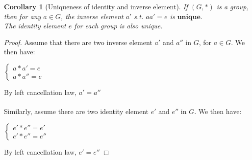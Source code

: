 \documentclass{article}
\theoremstyle{MyNonumberplain}
\theoremstyle{break}
\newtheorem*{proof}{Proof. }
\theoremstyle{break}
\newtheorem{corollary}{Corollary}[theorem]
\theoremstyle{break}
\theoremstyle{definition}
\theoremstyle{break}
\begin{document}
\begin{thmbox}
    \begin{corollary}[Uniqueness of identity and inverse element]
        If $(G,*)$ is a group, then for any $a\in G$, the inverse element $a'$ s.t. $aa'=e$ is $\mathbf{unique}$.\\
        The identity element $e$ for each group is also unique.
    \end{corollary}
    \begin{prfbox}
        \begin{proof}
            Assume that there are two inverse element $a'$ and $a''$ in $G$, for $a\in G$. We then have:\\
            \begin{center}
                $\left\{\begin{array}{l}
                    a \ast a' = e\\
                    a \ast a'' = e
                  \end{array}\right.$    
            \end{center}
            By left cancellation law, $a'=a''$\\\\
            Similarly, assume there are two identity element $e'$ and $e''$ in $G$. We then have:\\
            \begin{center}
                $\left\{\begin{array}{l}
                    e' \ast e'' = e'\\
                    e' \ast e'' = e''
                  \end{array}\right.$
            \end{center}
            By left cancellation law, $e'=e''$
        \end{proof}
    \end{prfbox}
\end{thmbox}
\end{document}
